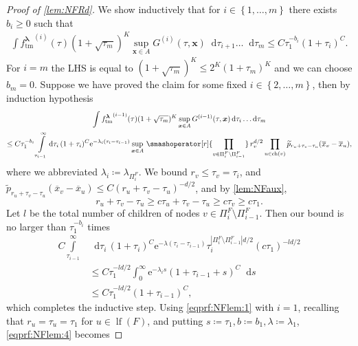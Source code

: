 \documentclass[reqno,draft]{amsart}
\numberwithin{equation}{section}
\theoremstyle{plain}
\theoremstyle{remark}
\newcommand*\diff{\mathop{}\!\mathrm{d}}
\newcommand{\e}{\mathrm{e}}
\DeclareMathOperator{\ch}{ch}
\newcommand{\fpart}{\Pi} %
\DeclareMathOperator{\lf}{lf}
\newcommand{\rfy}[1]{\widetilde{{#1}}} %
\newcommand{\ftm}{f_\mathrm{tm}^{\boldsymbol \lambda}}
\newcommand{\interp}{\overline{x}} %
\begin{document}
\begin{proof}[Proof of \cref{lem:NFRd}]
    We show inductively that for $i\in \left\{ 1, \ldots ,m \right\} $ there exists $b_i \ge 0$ such that
    \begin{align}\label{eqprf:NFlem:1}
        \int {\ftm}^{(i)}(\tau) (1+\sqrt{\tau_m} )^K\sup_{\boldsymbol x\in A}G^{(i)}(\tau,\boldsymbol x) \diff \tau_{i+1} \ldots \diff \tau_m \le C \tau_1^{-b_i} (1 + \tau_i)^C.
    \end{align}
    For $i = m$ the LHS is equal to $(1+\sqrt{\tau_m} )^K \le 2^K(1 + \tau_m)^K$ and we can choose $b_m = 0$. Suppose we have proved the claim for some fixed $i\in \left\{ 2, \ldots ,m \right\} $, then by induction hypothesis
    \begin{multline*}
        \int {\ftm}^{(i-1)}(\tau) (1+\sqrt{\tau_m} )^K \sup_{\boldsymbol x\in A} G^{(i-1)}(\tau,\boldsymbol x) \diff \tau_i \ldots \diff \tau_m\\
        \le C \tau_1^{-b_i} \int\limits_{\tau_{i-1}}^{\infty} \diff \tau_i\, (1 + \tau_i)^{C}\e^{-\lambda_i(\tau_i - \tau_{i-1})}\sup_{\boldsymbol x\in A}\,\smashoperator[r]{\prod_{v\in \fpart^F_i\setminus \fpart^F_{i-1}}}\, r_v^{d / 2}\prod_{u\in \ch(v)}\rfy{p}_{r_u+\tau_v-\tau_u}(\interp_v-\interp_u),
    \end{multline*}
    where we abbreviated $\lambda_i \coloneqq \lambda_{\fpart^F_i}$. We bound $r_v \le \tau_v = \tau_i$, and $\rfy{p}_{r_u+\tau_v-\tau_u}(\interp_v-\interp_u) \le C (r_u+\tau_v-\tau_u)^{-d / 2}$, and by \cref{lem:NFaux},
    \begin{equation}\label{eqprf:NFlem:3}
        r_u + \tau_v - \tau_u \ge c\tau_u + \tau_v-\tau_u \ge c\tau_v \ge c\tau_1.
    \end{equation}
    Let $l$ be the total number of children of nodes $v\in \fpart^F_i \setminus \fpart^F_{i-1}$. Then our bound is no larger than $\tau_1^{-b_i}$ times
    \begin{align*}
        C \int\limits_{\tau_{i-1}}^{\infty}& \diff \tau_i \, (1 +\tau_i)^{C}\e^{-\lambda(\tau_i-\tau_{i-1})} \tau_i^{|\fpart^F_i\setminus \fpart^F_{i-1}|d / 2} (c\tau_1)^{-ld / 2}\\
                                           &\le C \tau_1^{-ld / 2} \int_0^\infty \e^{-\lambda_i s}(1+\tau_{i-1} + s)^C \diff s\\
                                           &\le C \tau_1^{-ld / 2} (1 + \tau_{i-1})^C,
    \end{align*}
    which completes the inductive step. Using \cref{eqprf:NFlem:1} with $i = 1$, recalling that $r_u = \tau_u = \tau_1$ for $u\in \lf(F)$, and putting $s \coloneqq \tau_1, b\coloneqq b_1, \lambda\coloneqq \lambda_1$, \cref{eqprf:NFlem:4} becomes

\end{proof}
\end{document}
